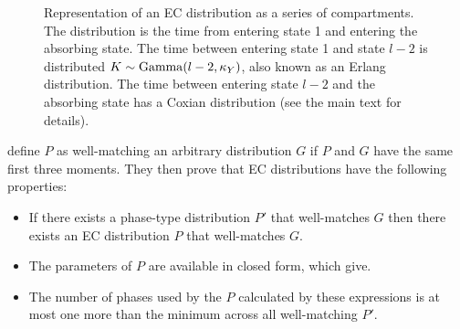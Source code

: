 \documentclass[thesis.tex]{subfiles}
\begin{document}
\begin{figure}
\caption[A $l$ phase EC distribution.]{Representation of an EC distribution as a series of compartments. The distribution is the time from entering state 1 and entering the absorbing state. The time between entering state 1 and state $l-2$ is distributed $K \sim \operatorname{Gamma}(l-2, \kappa_Y)$, also known as an Erlang distribution. The time between entering state $l-2$ and the absorbing state has a Coxian distribution (see the main text for details).}
\label{SEIR:fig:EC}
\end{figure}

\Textcite{osogamiClosed} define $P$ as well-matching an arbitrary distribution $G$ if $P$ and $G$ have the same first three moments.
They then prove that EC distributions have the following properties:
\begin{itemize}
    \item If there exists a phase-type distribution $P'$ that well-matches $G$ then there exists an EC distribution $P$ that well-matches $G$.
    \item The parameters of $P$ are available in closed form, which \textcite{osogamiClosed} give.
    \item The number of phases used by the $P$ calculated by these expressions is at most one more than the minimum across all well-matching $P'$.
\end{itemize}
\end{document}
